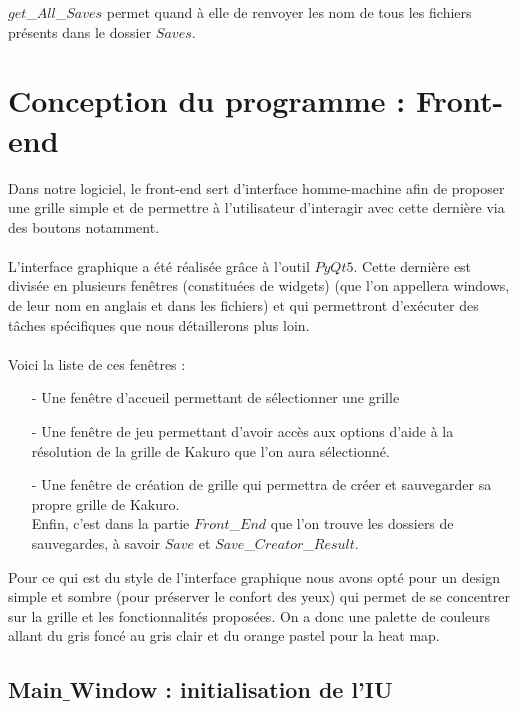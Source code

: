 \documentclass[12pt]{article}
\begin{document}
$get$\_$All$\_$Saves$ permet quand à elle de renvoyer les nom de tous les fichiers présents dans le dossier $Saves$.







\newpage
\section{Conception du programme : Front-end}
Dans notre logiciel, le front-end sert d'interface homme-machine afin de proposer une grille simple et de permettre à l'utilisateur d'interagir avec cette dernière via des boutons notamment. \\ \\
L'interface graphique a été réalisée grâce à l'outil $PyQt5$. Cette dernière est divisée en plusieurs fenêtres (constituées de widgets) (que l'on appellera windows, de leur nom en anglais et dans les fichiers) et qui permettront d'exécuter des tâches spécifiques que nous détaillerons plus loin. \\ \\
Voici la liste de ces fenêtres : \\

\begin{enumerate}
\item[-] Une fenêtre d'accueil permettant de sélectionner une grille  \\
\item[-] Une fenêtre de jeu permettant d'avoir accès aux options d'aide à la résolution de la grille de Kakuro que l'on aura sélectionné. \\
\item[-] Une fenêtre de création de grille qui permettra de créer et sauvegarder sa propre grille de Kakuro. \\
Enfin, c'est dans la partie $Front$\_$End$ que l'on trouve les dossiers de sauvegardes, à savoir $Save$ et $Save$\_$Creator$\_$Result$. \\
\end{enumerate}

Pour ce qui est du style de l'interface graphique nous avons opté pour un design simple et sombre (pour préserver le confort des yeux) qui permet de se concentrer sur la grille et les fonctionnalités proposées. On a donc une palette de couleurs allant du gris foncé au gris clair et du orange pastel pour la heat map.
\newpage
\subsection{Main$\_$Window : initialisation de l'IU}
\end{document}
